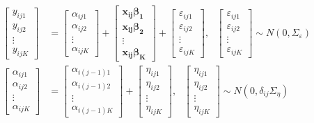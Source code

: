 \documentclass[
]{article}
\begin{document}
\begin{equation*}
\begin{aligned}
\begin{bmatrix}
y_{ij1}\\
y_{ij2}\\
\vdots\\
y_{ijK}
\end{bmatrix}
&= \begin{bmatrix}
\alpha_{ij1}\\
\alpha_{ij2}\\
\vdots\\
\alpha_{ijK}
\end{bmatrix}
+ 
\begin{bmatrix}
\boldsymbol{x_{ij}\beta_1}\\
\boldsymbol{x_{ij}\beta_2}\\
\vdots\\
\boldsymbol{x_{ij}\beta_K} 
\end{bmatrix} +
\begin{bmatrix}
\varepsilon_{ij1}\\
\varepsilon_{ij2}\\
\vdots\\
\varepsilon_{ijK}
\end{bmatrix}, \ \ \ 
\begin{bmatrix}
\varepsilon_{ij1}\\
\varepsilon_{ij2}\\
\vdots\\
\varepsilon_{ijK}
\end{bmatrix} 
\sim N(0, \Sigma_\varepsilon
)\\
\begin{bmatrix}
\alpha_{ij1}\\
\alpha_{ij2}\\
\vdots\\
\alpha_{ijK}
\end{bmatrix} & = 
\begin{bmatrix}
\alpha_{i(j-1)1}\\
\alpha_{i(j-1)2}\\
\vdots\\
\alpha_{i(j-1)K}
\end{bmatrix} +
\begin{bmatrix}
\eta_{ij1}\\
\eta_{ij2}\\
\vdots\\
\eta_{ijK}
\end{bmatrix}, \ \ \
\begin{bmatrix}
\eta_{ij1}\\
\eta_{ij2}\\
\vdots\\
\eta_{ijK}
\end{bmatrix} \sim N(0, \delta_{ij}\Sigma_\eta)
\end{aligned}
\end{equation*}
\end{document}
